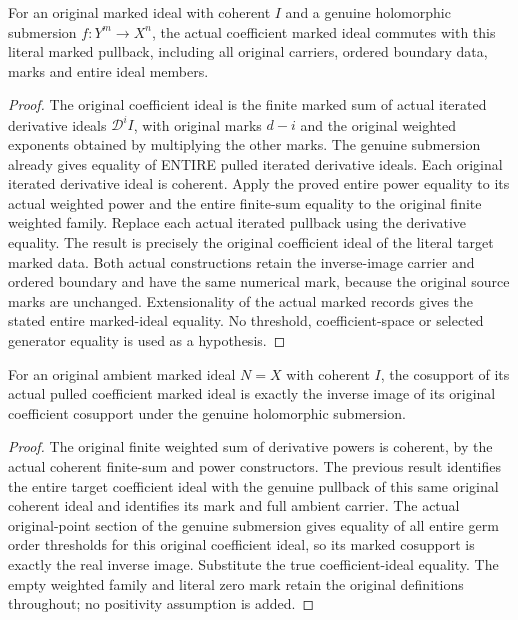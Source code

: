 \begin{theorem}\label{hir:submersion-entire-coefficient-ideal-equality}
For an original marked ideal with coherent $I$ and a genuine holomorphic
submersion $f:Y^m\to X^n$, the actual coefficient marked ideal commutes with
this literal marked pullback, including all original carriers, ordered
boundary data, marks and entire ideal members.
\leanok
{}
\end{theorem}
\begin{proof}
The original coefficient ideal is the finite marked sum of actual iterated
derivative ideals $\mathcal D^i I$, with original marks $d-i$ and the original
weighted exponents obtained by multiplying the other marks. The genuine
submersion already gives equality of ENTIRE pulled iterated derivative ideals.
Each original iterated derivative ideal is coherent. Apply the proved entire
power equality to its actual weighted power and the entire finite-sum equality
to the original finite weighted family. Replace each actual iterated pullback
using the derivative equality. The result is precisely the original coefficient
ideal of the literal target marked data. Both actual constructions retain the
inverse-image carrier and ordered boundary and have the same numerical mark,
because the original source marks are unchanged. Extensionality of the actual
marked records gives the stated entire marked-ideal equality. No threshold,
coefficient-space or selected generator equality is used as a hypothesis.
\end{proof}

\begin{theorem}\label{hir:submersion-actual-coefficient-cosupport-preimage}
For an original ambient marked ideal $N=X$ with coherent $I$, the cosupport
of its actual pulled coefficient marked ideal is exactly the inverse image of
its original coefficient cosupport under the genuine holomorphic submersion.
\leanok
{}
\end{theorem}
\begin{proof}
The original finite weighted sum of derivative powers is coherent, by the
actual coherent finite-sum and power constructors. The previous result identifies
the entire target coefficient ideal with the genuine pullback of this same
original coherent ideal and identifies its mark and full ambient carrier.
The actual original-point section of the genuine submersion gives equality of
all entire germ order thresholds for this original coefficient ideal, so its
marked cosupport is exactly the real inverse image. Substitute the true
coefficient-ideal equality. The empty weighted family and literal zero mark
retain the original definitions throughout; no positivity assumption is added.
\end{proof}
